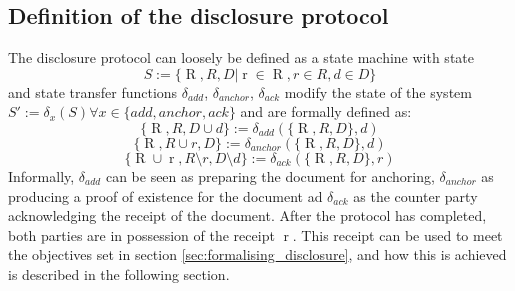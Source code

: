 \documentclass[12pt,msc,a4paper,oneside]{ucl_thesis}
\DeclareMathOperator{\Adrreceipt}{R}
\DeclareMathOperator{\adrreceipt}{r}
\begin{document}
\subsection{Definition of the disclosure protocol}
The disclosure protocol can loosely be defined as a state machine with state
\begin{equation}
    S := \{\Adrreceipt, R, D | \adrreceipt \in \Adrreceipt, r \in R, d \in D\}
    \label{eq:disclosure_state_machine}
\end{equation}
and state transfer functions $\delta_{add}$, $\delta_{anchor}$, $\delta_{ack}$ modify the state of the system $S' := \delta_x(S) \forall x \in \{add, anchor, ack\}$ and are formally defined as:
\begin{equation}
    \{\Adrreceipt, R, D \cup d\} := \delta_{add}(\{\Adrreceipt, R, D\}, d)
    \label{eq:disclosure_delta_add}
\end{equation}
\begin{equation}
    \{\Adrreceipt, R \cup r, D\} := \delta_{anchor}(\{\Adrreceipt, R, D\}, d)
    \label{eq:disclosure_delta_anchor}
\end{equation}
\begin{equation}
    \{\Adrreceipt \cup \adrreceipt, R \setminus r, D \setminus d\} := \delta_{ack}(\{\Adrreceipt, R, D\}, r)
    \label{eq:disclosure_delta_ack}
\end{equation}
Informally, $\delta_{add}$ can be seen as preparing the document for anchoring, $\delta_{anchor}$ as producing a proof of existence for the document ad $\delta_{ack}$ as the counter party acknowledging the receipt of the document. After the protocol has completed, both parties are in possession of the receipt $\adrreceipt$. This receipt can be used to meet the objectives set in section \ref{sec:formalising_disclosure}, and how this is achieved is described in the following section.
\end{document}

